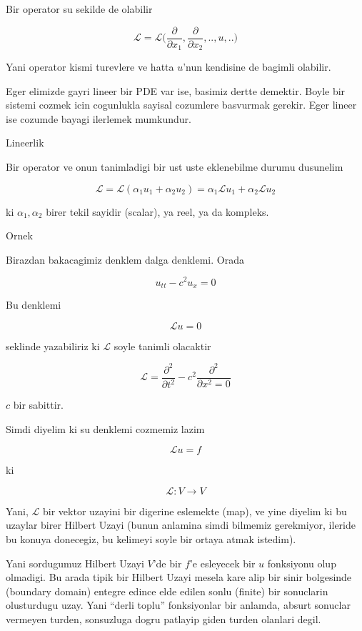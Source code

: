 \documentclass[12pt,fleqn]{article}\usepackage{../common}
\begin{document}
Bir operator su sekilde de olabilir

\[ \mathcal{L} = \mathcal{L} \bigg(
\frac{\partial }{\partial x_1}, \frac{\partial }{\partial x_2},..,
u,..
\bigg)
 \]

Yani operator kismi turevlere ve hatta $u$'nun kendisine de bagimli
olabilir. 

Eger elimizde gayri lineer bir PDE var ise, basimiz dertte demektir. Boyle
bir sistemi cozmek icin cogunlukla sayisal cozumlere basvurmak
gerekir. Eger lineer ise cozumde bayagi ilerlemek mumkundur. 

Lineerlik

Bir operator ve onun tanimladigi bir ust uste eklenebilme durumu dusunelim

\[ \mathcal{L} = \mathcal{L}(\alpha_1 u_1 + \alpha_2 u_2) = 
\alpha_1 \mathcal{L}u_1 + \alpha_2 \mathcal{L}u_2 \]

ki $\alpha_1,\alpha_2$ birer tekil sayidir (scalar), ya reel, ya da kompleks. 

Ornek

Birazdan bakacagimiz denklem dalga denklemi. Orada

\[ u_{tt} - c^2u_x = 0 \]

Bu denklemi

\[ \mathcal{L}u = 0 \]

seklinde yazabiliriz ki $\mathcal{L}$ soyle tanimli olacaktir

\[ \mathcal{L} = \frac{\partial^2}{\partial t^2} - 
c^2 \frac{\partial ^2}{\partial x^2 = 0}\]

$c$ bir sabittir. 

Simdi diyelim ki su denklemi cozmemiz lazim

\[\mathcal{L} u = f \]

ki

\[ \mathcal{L}: V \to V \]

Yani, $\mathcal{L}$ bir vektor uzayini bir digerine eslemekte (map), ve yine diyelim
ki bu uzaylar birer Hilbert Uzayi (bunun anlamina simdi bilmemiz
gerekmiyor, ileride bu konuya donecegiz, bu kelimeyi soyle bir ortaya atmak
istedim). 

Yani sordugumuz Hilbert Uzayi $V$'de bir $f$'e esleyecek bir $u$ fonksiyonu
olup olmadigi. Bu arada tipik bir Hilbert Uzayi mesela kare alip bir sinir
bolgesinde (boundary domain) entegre edince elde edilen sonlu (finite) bir
sonuclarin olusturdugu uzay. Yani ``derli toplu'' fonksiyonlar bir anlamda,
absurt sonuclar vermeyen turden, sonsuzluga dogru patlayip giden turden
olanlari degil. 
\end{document}
